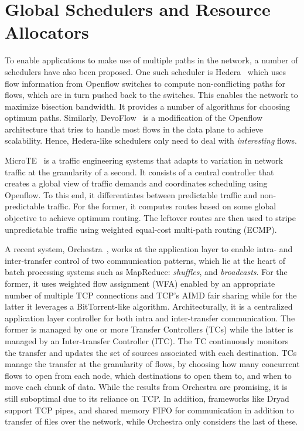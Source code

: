 \documentclass[a4paper,12pt,twoside,openright]{report}
\begin{document}
\section{Global Schedulers and Resource Allocators}
To enable applications to make use of multiple paths in the network, a number of
schedulers have also been proposed. One such scheduler is
Hedera~\cite{Al-Fares:2010:HDF} which uses flow information from Openflow
switches to compute non-conflicting paths for flows, which are in turn pushed
back to the switches. This enables the network to maximize bisection bandwidth.
It provides a number of algorithms for choosing optimum paths. Similarly,
DevoFlow~\cite{Curtis:2011:DSF} is a modification of the Openflow architecture
that tries to handle most flows in the data plane to achieve scalability. Hence,
Hedera-like schedulers only need to deal with \emph{interesting} flows.

MicroTE~\cite{Benson:2011:MFG} is a traffic engineering systems that adapts to
variation in network traffic at the granularity of a second. It consists of a
central controller that creates a global view of traffic demands and coordinates
scheduling using Openflow. To this end, it differentiates between predictable
traffic and non-predictable traffic. For the former, it computes routes based on
some global objective to achieve optimum routing. The leftover routes are then
used to stripe unpredictable traffic using weighted equal-cost multi-path
routing (ECMP).

A recent system, Orchestra~\cite{Chowdhury:2011:MDT}, works at the application
layer to enable intra- and inter-transfer control of two communication patterns,
which lie at the heart of batch processing systems such as MapReduce:
\emph{shuffles}, and \emph{broadcasts}. For the former, it uses weighted flow
assignment (WFA) enabled by an appropriate number of multiple TCP connections
and TCP's AIMD fair sharing while for the latter it leverages a BitTorrent-like
algorithm. Architecturally, it is a centralized application layer controller for
both intra and inter-transfer communication. The former is managed by one or
more Transfer Controllers (TCs) while the latter is managed by an Inter-transfer
Controller (ITC). The TC continuously monitors the transfer and updates the set
of sources associated with each destination. TCs manage the transfer at the
granularity of flows, by choosing how many concurrent flows to open from each
node, which destinations to open them to, and when to move each chunk of data.
While the results from Orchestra are promising, it is still suboptimal due to
its reliance on TCP. In addition, frameworks like Dryad support TCP pipes, and
shared memory FIFO for communication in addition to transfer of files over the
network, while Orchestra only considers the last of these.
\end{document}
